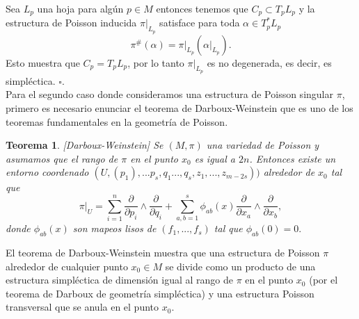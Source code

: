\documentclass[a4paper,10pt]{book}
\newtheorem{teo}{Teorema}[chapter]
\begin{document}
Sea $L_{p}$ una hoja para alg\'un $p\in M$ entonces tenemos que $C_{p}\subset T_{p}L_{p}$ y la estructura de Poisson inducida $\pi|_{L_{p}}$ satisface para toda $\alpha\in T^{*}_{p}L_{p}$ 
$$\pi^{\#}(\alpha)=\pi|_{L_{p}}(\alpha|_{L_{p}}).$$
Esto muestra que $C_{p}=T_{p}L_{p}$, por lo tanto $\pi|_{L_{p}}$ es no degenerada, es decir, es simpl\'ectica. \hfill $\square$.\\

Para el segundo caso donde consideramos una estructura de Poisson singular $\pi$, primero es necesario enunciar el teorema de Darboux-Weinstein que es uno de los teoremas fundamentales en la geometr\'ia de Poisson. 

\begin{teo}\label{TeoD-W}[Darboux-Weinstein]
Se $(M,\pi)$ una variedad de Poisson y asumamos que el rango de $\pi$ en el punto $x_{0}$ es igual a $2n$. Entonces existe un entorno coordenado $(U,(p_{1}),...p_{s},q_{1}...,q_{s},z_{1},...,z_{m-2s}))$ alrededor de $x_{0}$ tal que 
\begin{equation}
\pi|_{U}=\sum\limits_{i=1}^{n}\frac{\partial}{\partial p_{i}}\wedge\frac{\partial}{\partial q_{i}} + \sum\limits_{a,b=1}^{s}\phi_{ab}(x)\frac{\partial}{\partial x_{a}}\wedge\frac{\partial}{\partial x_{b}},
\end{equation}
donde $\phi_{ab}(x)$ son mapeos lisos de $(f_{1},...,f_{s})$ tal que $\phi_{ab}(0)=0.$
\end{teo}

El teorema de Darboux-Weinstein muestra que una estructura de Poisson $\pi$ alrededor de cualquier punto $x_{0}\in M$ se divide como un producto de una estructura simpl\'ectica de dimensi\'on igual al rango de $\pi$ en el punto $x_{0}$ (por el teorema de Darboux de geometr\'ia simpl\'ectica) y una estructura Poisson transversal que se anula en el punto $x_{0}$.\\
\end{document}
